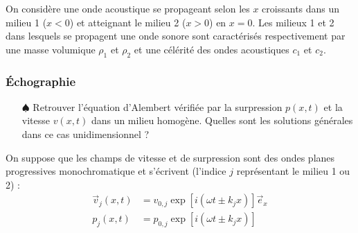 \documentclass{report}
\begin{document}
On considère une onde acoustique se propageant selon les $x$ croissants dans un milieu 1 ($x<0$) et atteignant le milieu 2 ($x>0$) en $x=0$. Les milieux 1 et 2 dans lesquels se propagent une onde sonore sont caractérisés respectivement par une masse volumique $\rho_1$ et $\rho_2$ et une célérité des ondes acoustiques $c_1$ et $c_2$. 

\subsubsection*{Échographie}

\begin{itemize}
	
	\item[$\spadesuit$] Retrouver l'équation d'Alembert vérifiée par la surpression $p(x,t)$ et la vitesse $v(x,t)$ dans un milieu homogène. Quelles sont les solutions générales dans ce cas unidimensionnel ? 

\end{itemize}	
	
On suppose que les champs de vitesse et de surpression sont des ondes planes progressives monochromatique et s'écrivent (l'indice $j$ représentant le milieu 1 ou 2) :
\begin{align*}
	\vec{v}_j(x,t)&=v_{0,j}\exp\left[i(\omega t\pm k_jx ) \right] \vec{e}_x \\
	p_j(x,t)&=p_{0,j}\exp\left[i(\omega t \pm k_jx ) \right]
\end{align*}
\end{document}
